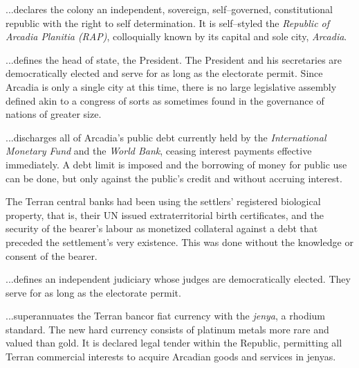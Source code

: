 
\startarticle
\item %

...declares the colony an independent, sovereign, self--governed, constitutional republic with the right to self determination. It is self--styled the {\it Republic of Arcadia Planitia (RAP)}, colloquially known by its capital and sole city, {\it Arcadia}.

\item %

...defines the head of state, the President. The President and his secretaries are democratically elected and serve for as long as the electorate permit. Since Arcadia is only a single city at this time, there is no large legislative assembly defined akin to a congress of sorts as sometimes found in the governance of nations of greater size.

\item %

...discharges all of Arcadia's public debt currently held by the {\it International Monetary Fund} and the {\it World Bank}, ceasing interest payments effective immediately. A debt limit is imposed and the borrowing of money for public use can be done, but only against the public's credit and without accruing interest.

The Terran central banks had been using the settlers' registered biological property, that is, their UN issued extraterritorial birth certificates, and the security of the bearer's labour as monetized collateral against a debt that preceded the settlement's very existence. This was done without the knowledge or consent of the bearer.

\item %

...defines an independent judiciary whose judges are democratically elected. They serve for as long as the electorate permit.
\stoparticle

\startarticle[start=7]
\item %

...superannuates the Terran bancor fiat currency with the {\it jenya}, a rhodium standard. The new hard currency consists of platinum metals more rare and valued than gold. It is declared legal tender within the Republic, permitting all Terran commercial interests to acquire Arcadian goods and services in jenyas.

